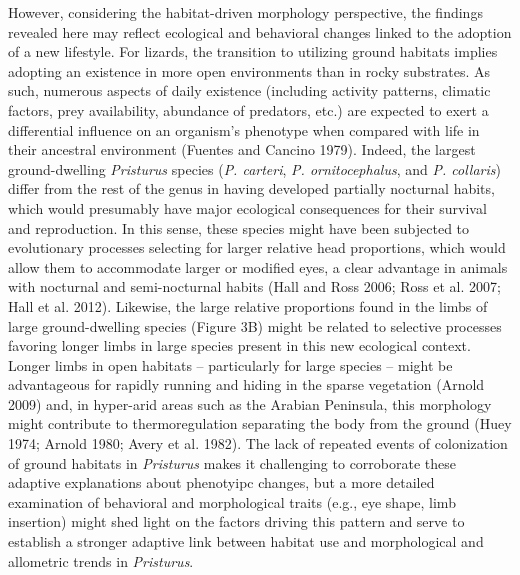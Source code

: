 \documentclass[
  11pt,
]{article}
\begin{document}
However, considering the habitat-driven morphology perspective, the
findings revealed here may reflect ecological and behavioral changes
linked to the adoption of a new lifestyle. For lizards, the transition
to utilizing ground habitats implies adopting an existence in more open
environments than in rocky substrates. As such, numerous aspects of
daily existence (including activity patterns, climatic factors, prey
availability, abundance of predators, etc.) are expected to exert a
differential influence on an organism's phenotype when compared with
life in their ancestral environment (Fuentes and Cancino 1979). Indeed,
the largest ground-dwelling \emph{Pristurus} species (\emph{P. carteri},
\emph{P. ornitocephalus}, and \emph{P. collaris}) differ from the rest
of the genus in having developed partially nocturnal habits, which would
presumably have major ecological consequences for their survival and
reproduction. In this sense, these species might have been subjected to
evolutionary processes selecting for larger relative head proportions,
which would allow them to accommodate larger or modified eyes, a clear
advantage in animals with nocturnal and semi-nocturnal habits (Hall and
Ross 2006; Ross et al. 2007; Hall et al. 2012). Likewise, the large
relative proportions found in the limbs of large ground-dwelling species
(Figure 3B) might be related to selective processes favoring longer
limbs in large species present in this new ecological context. Longer
limbs in open habitats -- particularly for large species -- might be
advantageous for rapidly running and hiding in the sparse vegetation
(Arnold 2009) and, in hyper-arid areas such as the Arabian Peninsula,
this morphology might contribute to thermoregulation separating the body
from the ground (Huey 1974; Arnold 1980; Avery et al. 1982). The lack of
repeated events of colonization of ground habitats in \emph{Pristurus}
makes it challenging to corroborate these adaptive explanations about
phenotyipc changes, but a more detailed examination of behavioral and
morphological traits (e.g., eye shape, limb insertion) might shed light
on the factors driving this pattern and serve to establish a stronger
adaptive link between habitat use and morphological and allometric
trends in \emph{Pristurus}. \hfill\break
\end{document}
